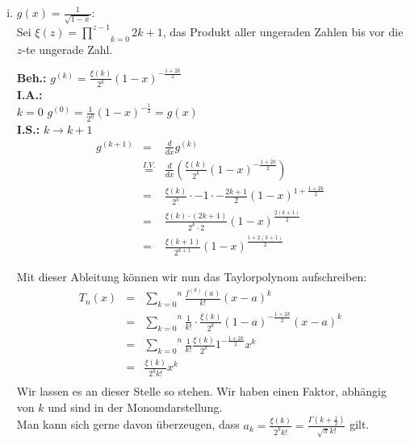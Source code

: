 \documentclass[11pt,a4paper,ngerman]{article}
\begin{document}
\begin{enumerate}[(i)]
    \item $g(x) = \frac{1}{\sqrt{1-x}}$:\\
        Sei $\xi (z) = \underset{k=0}{\overset{z-1}{\prod}} 2k+1$, das Produkt aller ungeraden Zahlen
        bis vor die $z$-te ungerade Zahl.
    
        \textbf{Beh.:} $g^{(k)} = \frac{\xi(k)}{2^k} (1-x)^{-\frac{1+2k}{2}}$ \\
        \textbf{I.A.:} \\
            $k=0$ $g^{(0)} = \frac{1}{2^0} (1-x)^{-\frac{1}{2}} = g(x)$\\
        \textbf{I.S.:} $k \rightarrow k+1$\\
            $$\begin{array}{rcl}
                g^{(k+1)} &=& \frac{d}{dx} g^{(k)}\\
                        &\stackrel{I.V.}{=}&
                            \frac{d}{dx} \left(\frac{\xi(k)}{2^{k}} (1-x)^{-\frac{1+2k}{2}} \right)\\
                        &=& \frac{\xi(k)}{2^{k}} \cdot -1 \cdot -\frac{2k+1}{2} (1-x)^{1+\frac{1+2k}{2}}\\
                        &=& \frac{\xi(k) \cdot (2k+1)}{2^{k}\cdot 2} (1-x)^{\frac{2(k+1)}{2}}\\
                        &=& \frac{\xi(k+1)}{2^{k+1}} (1-x)^{\frac{1+2(k+1)}{2}}
            \end{array}$$

        Mit dieser Ableitung können wir nun das Taylorpolynom aufschreiben:\\
        $$\begin{array}{rcl}
            T_n(x) &=& \overset{n}{\underset{k=0}{\sum}} 
                    \frac{f^{(k)}(a)}{k!} (x-a)^k\\
                &=& \overset{n}{\underset{k=0}{\sum}}
                    \frac{1}{k!} \cdot \frac{\xi(k)}{2^k} (1-a)^{-\frac{1+2k}{2}} (x-a)^k\\
                &=& \overset{n}{\underset{k=0}{\sum}}
                    \frac{1}{k!} \frac{\xi(k)}{2^k} 1^{-\frac{1+2k}{2}} x^k\\
                &=& \frac{\xi(k)}{2^k k!} x^k\\
        \end{array}$$
        Wir lassen es an dieser Stelle so stehen. Wir haben einen Faktor, abhängig von $k$
        und sind in der Monomdarstellung.\\
        Man kann sich gerne davon überzeugen, dass 
        $a_k = \frac{\xi(k)}{2^k k!} = \frac{\Gamma(k + \frac{1}{2})}{\sqrt{\pi} k!}$ gilt.
            

\end{enumerate}
\end{document}
